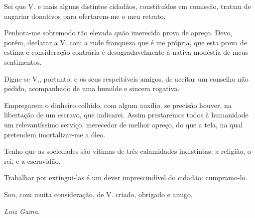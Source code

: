 {Sei que V. e mais alguns distintos cidadãos, constituídos em comissão,
tratam de angariar donativos para ofertarem-me o meu retrato.

Penhora-me sobremodo tão elevada quão imerecida prova de apreço. Devo,
porém, declarar a V. com a rude franqueza que é me própria, que esta
prova de estima e consideração contrária é desagradavelmente à nativa
modéstia de meus sentimentos.

Digne-se V., portanto, e os seus respeitáveis amigos, de aceitar um
conselho não pedido, acompanhado de uma humilde e sincera rogativa.

Empregarem o dinheiro colhido, com algum auxílio, se precisão houver, na
libertação de um escravo, que indicarei. Assim prestaremos todos à
humanidade um relevantíssimo serviço, merecedor de melhor apreço, do que
a tela, na qual pretendem imortalizar-me a óleo.

Tenho que as sociedades são vítimas de três calamidades indistintas: a
religião, o rei, e a escravidão.

Trabalhar por extingui-las é um dever imprescindível do cidadão:
cumpramo-lo.

Sou, com muita consideração, de V. criado, obrigado e amigo,

\emph{Luiz Gama}.

\pagebreak
\mbox{}\vfill
\thispagestyle{empty}

}
